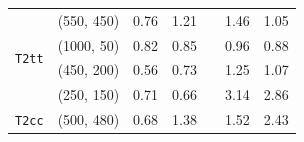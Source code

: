 \begin{table}[!t]
\begin{tabular}{ llccccc }
                                            & (550, 450)    & 0.76 & 1.21 &  & 1.46 & 1.05 \\ [0.5ex]
    \multirow{2}{*}{\texttt{T2tt}}          & (1000, 50)    & 0.82 & 0.85 &  & 0.96 & 0.88 \\
                                            & (450, 200)    & 0.56 & 0.73 &  & 1.25 & 1.07 \\ 
                                            & (250, 150)    & 0.71 & 0.66 &  & 3.14 & 2.86 \\ [0.5ex]
    \multirow{1}{*}{\texttt{T2cc}}          & (500, 480)    & 0.68 & 1.38 &  & 1.52 & 2.43 \\ [0.5ex]
    \hline
  \end{tabular}
\end{table}



